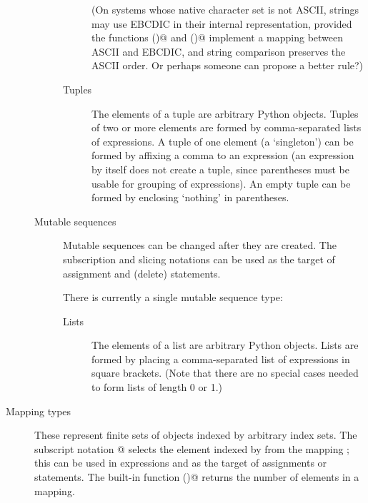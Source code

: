 \begin{description}
\begin{description}
\begin{description}
(On systems whose native character set is not ASCII, strings may use
EBCDIC in their internal representation, provided the functions
\verb@chr()@ and \verb@ord()@ implement a mapping between ASCII and
EBCDIC, and string comparison preserves the ASCII order.
Or perhaps someone can propose a better rule?)

\item[Tuples]
The elements of a tuple are arbitrary Python objects.
Tuples of two or more elements are formed by comma-separated lists
of expressions.  A tuple of one element (a `singleton') can be formed
by affixing a comma to an expression (an expression by itself does
not create a tuple, since parentheses must be usable for grouping of
expressions).  An empty tuple can be formed by enclosing `nothing' in
parentheses.

\end{description} %

\item[Mutable sequences]
Mutable sequences can be changed after they are created.  The
subscription and slicing notations can be used as the target of
assignment and \verb@del@ (delete) statements.

There is currently a single mutable sequence type:

\begin{description}

\item[Lists]
The elements of a list are arbitrary Python objects.  Lists are formed
by placing a comma-separated list of expressions in square brackets.
(Note that there are no special cases needed to form lists of length 0
or 1.)

\end{description} %

\end{description} %

\item[Mapping types]
These represent finite sets of objects indexed by arbitrary index sets.
The subscript notation \verb@a[k]@ selects the element indexed
by \verb@k@ from the mapping \verb@a@; this can be used in
expressions and as the target of assignments or \verb@del@ statements.
The built-in function \verb@len()@ returns the number of elements
in a mapping.


\end{description}
